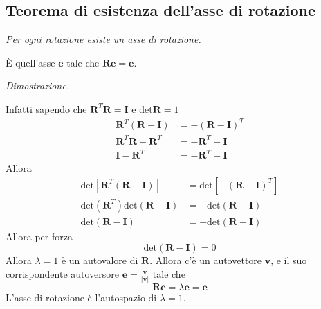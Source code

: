 \documentclass[10pt,a4paper,twoside]{book}
\begin{document}
\subsection{Teorema di esistenza dell'asse di rotazione}

\textit{Per ogni rotazione esiste un asse di rotazione.}

È quell'asse $\mathbf{e}$ tale che $\mathbf{Re} =\mathbf{e}$.

\textit{Dimostrazione.}

Infatti sapendo che $\mathbf{R}^{T}\mathbf{R} =\mathbf{I}$ e $\mathrm{det}\mathbf{R} =1$
\begin{equation*}
\begin{aligned}
\mathbf{R}^{T}(\mathbf{R} -\mathbf{I}) & =-(\mathbf{R} -\mathbf{I})^{T}\\
\mathbf{R}^{T}\mathbf{R} -\mathbf{R}^{T} & =-\mathbf{R}^{T} +\mathbf{I}\\
\mathbf{I} -\mathbf{R}^{T} & =-\mathbf{R}^{T} +\mathbf{I}
\end{aligned}
\end{equation*}
Allora
\begin{equation*}
\begin{aligned}
\mathrm{det}\left[\mathbf{R}^{T}(\mathbf{R} -\mathbf{I})\right] & =\mathrm{det}\left[ -(\mathbf{R} -\mathbf{I})^{T}\right]\\
\mathrm{det}\left(\mathbf{R}^{T}\right)\mathrm{det}(\mathbf{R} -\mathbf{I}) & =-\mathrm{det}(\mathbf{R} -\mathbf{I})\\
\mathrm{det}(\mathbf{R} -\mathbf{I}) & =-\mathrm{det}(\mathbf{R} -\mathbf{I})
\end{aligned}
\end{equation*}
Allora per forza
\begin{equation*}
\mathrm{det}(\mathbf{R} -\mathbf{I}) =0
\end{equation*}
Allora $\lambda =1$ è un autovalore di $\mathbf{R}$. Allora c'è un autovettore $\mathbf{v}$, e il suo corrispondente autoversore $\mathbf{e} =\frac{\mathbf{v}}{| \mathbf{v}| }$ tale che
\begin{equation*}
\mathbf{Re} =\lambda \mathbf{e} =\mathbf{e}
\end{equation*}
L'asse di rotazione è l'autospazio di $\lambda =1$.
\end{document}
